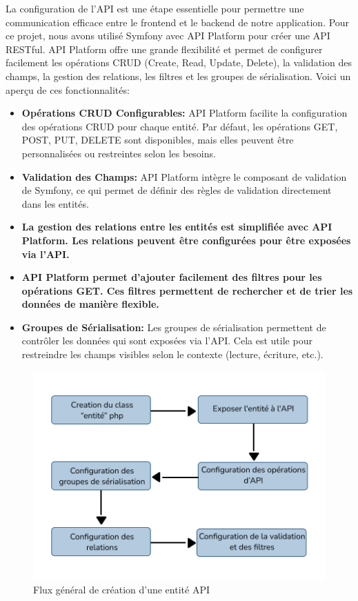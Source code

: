 \hspace{16pt}La configuration de l'API est une étape essentielle pour permettre une communication efficace entre le frontend et le backend de notre application. Pour ce projet, nous avons utilisé Symfony avec API Platform pour créer une API RESTful. API Platform offre une grande flexibilité et permet de configurer facilement les opérations CRUD (Create, Read, Update, Delete), la validation des champs, la gestion des relations, les filtres et les groupes de sérialisation. Voici un aperçu de ces fonctionnalités:

\begin{itemize}
  \item \textbf{Opérations CRUD Configurables: }API Platform facilite la configuration des opérations CRUD pour chaque entité. Par défaut, les opérations GET, POST, PUT, DELETE sont disponibles, mais elles peuvent être personnalisées ou restreintes selon les besoins.
  \item \textbf{Validation des Champs: }API Platform intègre le composant de validation de Symfony, ce qui permet de définir des règles de validation directement dans les entités.
  \item \textbf{La gestion des relations entre les entités est simplifiée avec API Platform. Les relations peuvent être configurées pour être exposées via l'API.}
  \item \textbf{API Platform permet d'ajouter facilement des filtres pour les opérations GET. Ces filtres permettent de rechercher et de trier les données de manière flexible.}
  \item \textbf{Groupes de Sérialisation: }Les groupes de sérialisation permettent de contrôler les données qui sont exposées via l'API. Cela est utile pour restreindre les champs visibles selon le contexte (lecture, écriture, etc.).
\end{itemize}

\begin{figure}[H] 
    \centering
    \includegraphics[scale=0.9]{Figures/api_entity.png}
    \caption{Flux général de création d'une entité API}
\end{figure}

